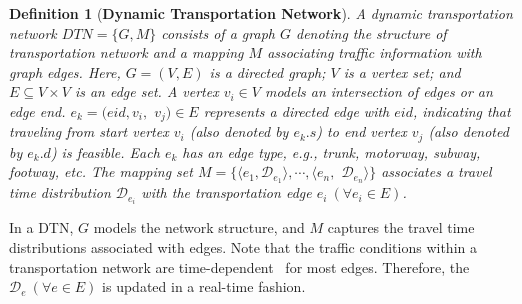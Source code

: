 \documentclass{vldb}
\newtheorem{definition}{Definition}
\begin{document}
	\begin{definition}[\textbf{Dynamic Transportation Network}]
		\label{def:dtn}
		A dynamic transportation network $DTN=\{G,M\}$ consists of a graph $G$ denoting the structure of transportation network and a mapping $M$ associating traffic information with graph edges. Here, $G=(V,E)$ is a directed graph; $V$ is a vertex set; and $E\subseteq V\times V$ is an edge set.  
		A vertex $v_i\in V$ models an intersection of edges or an edge end.
		$e_k=(eid,v_i,$ $v_j)\in E$ represents a directed edge with  $eid$, indicating that traveling from start vertex $v_i$ (also denoted by $e_k.s$) to end vertex $v_j$ (also denoted by $e_k.d$) is feasible. 
		Each $e_k$ has an edge type, e.g., trunk, motorway, subway, footway, etc.
		The mapping set $M=\{\langle e_1,\mathcal{D}_{e_1}\rangle, \cdots, \langle e_n,$ $\mathcal{D}_{e_n}\rangle\}$ associates a travel time distribution $\mathcal{D}_{e_i}$ with the transportation edge $e_i \ (\forall e_i \in E)$.
	\end{definition}
	
	In a DTN, $G$ models the network structure, and $M$ captures the travel time distributions associated with edges.
	Note that the traffic conditions within a transportation network are time-dependent~\cite{chang2005multiobjective,yang2014stochastic,DBLP:conf/kdd/WuMSZZCW16} for most edges.
	Therefore, the $\mathcal{D}_{e} \ (\forall e \in E)$ is updated in a real-time fashion.
	
	
\end{document}
